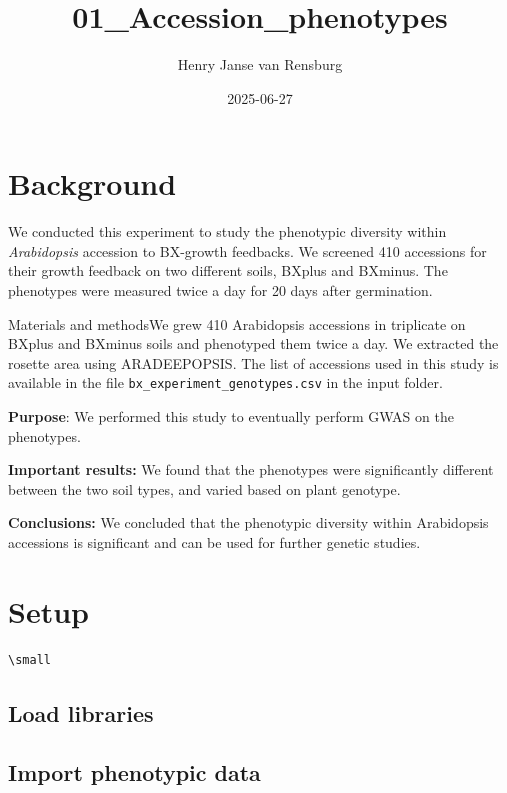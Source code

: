\documentclass[
  11pt,
]{article}
\title{01\_Accession\_phenotypes}
\author{Henry Janse van Rensburg}
\date{2025-06-27}
\renewcommand*\contentsname{Table of contents}
\newcommand\contentsname{Table of contents}
\begin{document}
\maketitle

\renewcommand*\contentsname{Table of contents}
{
\hypersetup{linkcolor=}
\setcounter{tocdepth}{2}
\tableofcontents
}

\section{Background}\label{background}

We conducted this experiment to study the phenotypic diversity within
\emph{Arabidopsis} accession to BX-growth feedbacks. We screened 410
accessions for their growth feedback on two different soils, BXplus and
BXminus. The phenotypes were measured twice a day for 20 days after
germination.

Materials and methodsWe grew 410 Arabidopsis accessions in triplicate on
BXplus and BXminus soils and phenotyped them twice a day. We extracted
the rosette area using ARADEEPOPSIS. The list of accessions used in this
study is available in the file \texttt{bx\_experiment\_genotypes.csv} in
the input folder.

\textbf{Purpose}: We performed this study to eventually perform GWAS on
the phenotypes.

\textbf{Important results:} We found that the phenotypes were
significantly different between the two soil types, and varied based on
plant genotype.

\textbf{Conclusions:} We concluded that the phenotypic diversity within
Arabidopsis accessions is significant and can be used for further
genetic studies.

\section{Setup}\label{setup}

\begin{verbatim}
\small
\end{verbatim}

\subsection{Load libraries}\label{load-libraries}

\subsection{Import phenotypic data}\label{import-phenotypic-data}
\end{document}
